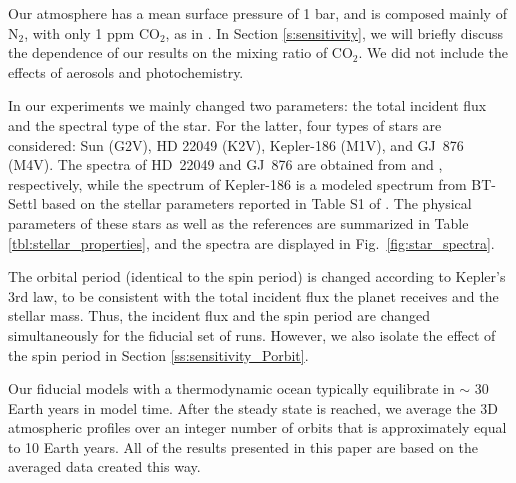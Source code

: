 \documentclass[11pt,numberedappendix,twocolappendix,]{emulateapj}
\newcommand{\dsa}[1]{{\color{blue}#1}}
\begin{document}
Our atmosphere \dsa{has a mean surface pressure of 1 bar, and is composed mainly of N$_2$, with only 1 ppm CO$_2$, as in} \citet{Kopparapu2016}. 
In Section \ref{s:sensitivity}, we will briefly discuss the dependence \dsa{of our results} on the mixing ratio of CO$_2$. 
We did not include \dsa{the effects of aerosols and photochemistry.}


In our experiments we mainly changed two parameters: the total incident flux and the spectral type of the star. 
For the latter, four types of stars are considered: 
Sun (G2V), 
HD 22049 (K2V), 
Kepler-186 (M1V), and 
GJ~876 (M4V). 
The spectra of HD~22049 and GJ~876 are obtained from \citet{Segura2003} and \citet{Domagal-Goldman2014}, respectively, 
while the spectrum of Kepler-186 is a \dsa{modeled spectrum from BT-Settl} \citep{Allard2012} based on the stellar parameters reported in Table S1 of \citet{Quintana2014}. 
The physical parameters of these stars as well as the references are summarized in Table \ref{tbl:stellar_properties}, and the spectra are displayed in \dsa{Fig.~\ref{fig:star_spectra}}. 

The orbital period (\dsa{identical to the} spin period) is changed according to Kepler's 3rd law, to be consistent with the total incident flux the planet receives and the stellar mass. Thus, the incident flux and the spin period are changed simultaneously for the fiducial set of runs. 
However, we also isolate the effect of the spin period in Section \ref{ss:sensitivity_Porbit}. 

Our fiducial models with \dsa{a} thermodynamic ocean typically equilibrate in $\sim $ 30 Earth years in model time. 
After the steady state is reached, we average the \dsa{3D} atmospheric profiles over an integer number of orbits that is approximately \dsa{equal to} 10 Earth years. 
All of the \dsa{results} presented in this paper are based on the averaged data created this way. 
\end{document}
